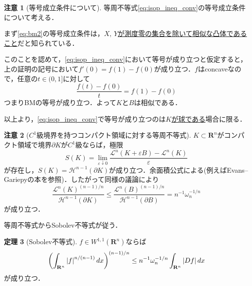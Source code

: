 \documentclass[a4j]{ltjsarticle}
\newcommand{\Rset}{\mathbf{R}}
\newcommand{\Lm}{\mathcal{L}}
\newcommand{\Hm}{\mathcal{H}}
\newcommand{\1}{\bm{1}}
\numberwithin{equation}{section}
\theoremstyle{definition}
\newtheorem{thm}{定理}[section]
\newtheorem{rmk}[thm]{注意}
\begin{document}
\begin{rmk}[等号成立条件について]
    等周不等式\eqref{eq:isop_ineq_conv}の等号成立条件について考える．
    
    まず\eqref{eq:bm2}の等号成立条件は，\underline{$X,\,Y$が測度零の集合を除いて相似な凸体であること}だと知られている．

    このことを認めて，\eqref{eq:isop_ineq_conv}において等号が成り立つと仮定すると，上の証明の記号において$f'(0)=f(1)-f(0)$が成り立つ．$f$はconcaveなので，任意の$t\in(0,1]$に対して
    \begin{equation}
        \frac{f(t)-f(0)}{t}=f(1)-f(0)
    \end{equation}
    つまりBMの等号が成り立つ．よって$K$と$B$は相似である．

    以上より，\eqref{eq:isop_ineq_conv}で等号が成り立つのは\underline{$K$が球である}場合に限る．
\end{rmk}
\begin{rmk}[$C^1$級境界を持つコンパクト領域に対する等周不等式]
    $K\subset \Rset^n$がコンパクト領域で境界$\partial K$が$C^1$級ならば，極限
    \begin{equation}
        S(K)=\lim_{\varepsilon\downarrow0}\frac{\Lm^n(K+\varepsilon B)-\Lm^n(K)}{\varepsilon}
    \end{equation}
    が存在し，$S(K)=\Hm^{n-1}(\partial K)$が成り立つ．余面積公式による(例えばEvans--Gariepyの本\cite{EG}を参照)．したがって同様の議論により
    \begin{equation}
        \frac{\Lm^n(K)^{(n-1)/n}}{\Hm^{n-1}(\partial K)}\leq \frac{\Lm^n(B)^{(n-1)/n}}{\Hm^{n-1}(\partial B)}=n^{-1}\omega_n^{-1/n}\label{eq:isop_ineq_c1}\tag{IP2}
    \end{equation}
    が成り立つ．
\end{rmk}
等周不等式からSobolev不等式が従う．
\begin{thm}[Sobolev不等式]
    $f\in W^{1,1}(\Rset^n)$ならば
    \begin{equation}
        \qty(\int_{\Rset^n}\abs{f}^{n/(n-1)}\,dx)^{(n-1)/n}\leq n^{-1}\omega_n^{-1/n}\int_{\Rset^n}\abs{Df}\,dx
    \end{equation}
    が成り立つ．
\end{thm}
\end{document}
